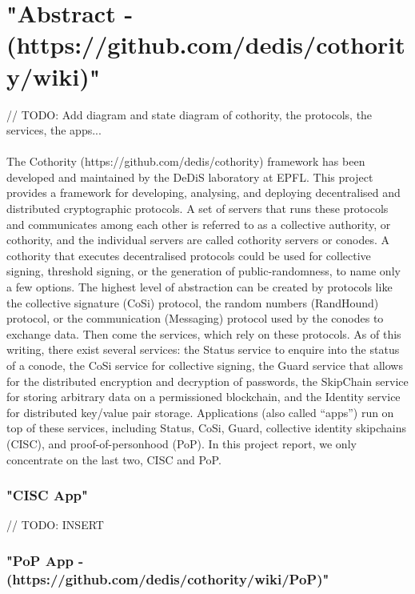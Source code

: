 \section*{"Abstract - (https://github.com/dedis/cothority/wiki)"}

// TODO: Add diagram and state diagram of cothority, the protocols, the services, the apps...

\paragraph{}
The Cothority (https://github.com/dedis/cothority) framework has been developed and maintained by the DeDiS laboratory at EPFL. This project provides a framework for developing, analysing, and deploying decentralised and distributed cryptographic protocols. A set of servers that runs these protocols and communicates among each other is referred to as a collective authority, or cothority, and the individual servers are called cothority servers or conodes. A cothority that executes decentralised protocols could be used for collective signing, threshold signing, or the generation of public-randomness, to name only a few options. The highest level of abstraction can be created by protocols like the collective signature (CoSi) protocol, the random numbers (RandHound) protocol, or the communication (Messaging) protocol used by the conodes to exchange data. Then come the services, which rely on these protocols. As of this writing, there exist several services: the Status service to enquire into the status of a conode, the CoSi service for collective signing, the Guard service that allows for the distributed encryption and decryption of passwords, the SkipChain service for storing arbitrary data on a permissioned blockchain, and the Identity service for distributed key/value pair storage. Applications (also called “apps”) run on top of these services, including Status, CoSi, Guard, collective identity skipchains (CISC), and proof-of-personhood (PoP). In this project report, we only concentrate on the last two, CISC and PoP.

\subsubsection*{"CISC App"}

// TODO: INSERT

\subsubsection*{"PoP App - (https://github.com/dedis/cothority/wiki/PoP)"}

